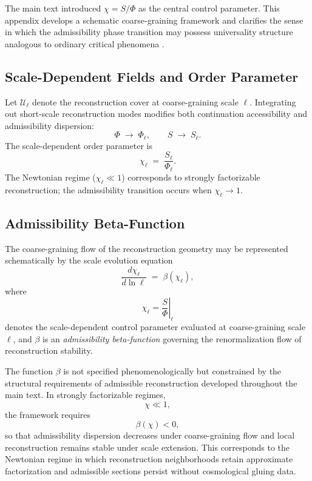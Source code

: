 \documentclass[11pt, a4paper]{article}
\theoremstyle{plain}
\theoremstyle{definition}
\theoremstyle{remark}
\newcommand{\Ucover}{\mathcal{U}}
\begin{document}
The main text introduced $\chi = S/\Phi$ as the central control parameter. This
appendix develops a schematic coarse-graining framework and clarifies the sense in
which the admissibility phase transition may possess universality structure analogous
to ordinary critical phenomena \cite{wilson1974,goldenfeld1992}.

\subsection{Scale-Dependent Fields and Order Parameter}

Let $\Ucover_\ell$ denote the reconstruction cover at coarse-graining scale $\ell$.
Integrating out short-scale reconstruction modes modifies both continuation
accessibility and admissibility dispersion:
\[
  \Phi \;\longrightarrow\; \Phi_\ell, \qquad S \;\longrightarrow\; S_\ell.
\]
The scale-dependent order parameter is
\[
  \chi_\ell \;=\; \frac{S_\ell}{\Phi_\ell}.
\]
The Newtonian regime ($\chi_\ell \ll 1$) corresponds to strongly factorizable
reconstruction; the admissibility transition occurs when $\chi_\ell \to 1$.

\subsection{Admissibility Beta-Function}

The coarse-graining flow of the reconstruction geometry may be represented
schematically by the scale evolution equation
\begin{equation}
  \label{eq:beta}
  \frac{d\chi_\ell}{d\ln \ell}
  \;=\;
  \beta(\chi_\ell),
\end{equation}
where
\[
  \chi_\ell
  =
  \left.\frac{S}{\Phi}\right|_{\ell}
\]
denotes the scale-dependent control parameter evaluated at coarse-graining scale
$\ell$, and $\beta$ is an \emph{admissibility beta-function} governing the
renormalization flow of reconstruction stability.

The function $\beta$ is not specified phenomenologically but constrained by the
structural requirements of admissible reconstruction developed throughout the main
text.  In strongly factorizable regimes,
\[
  \chi \ll 1,
\]
the framework requires
\[
  \beta(\chi) < 0,
\]
so that admissibility dispersion decreases under coarse-graining flow and local
reconstruction remains stable under scale extension.  This corresponds to the
Newtonian regime in which reconstruction neighborhoods retain approximate
factorization and admissible sections persist without cosmological gluing data.
\end{document}
